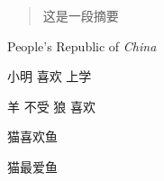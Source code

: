 \documentclass{ctexart}
\newcommand{\PRC}{People's Republic of \emph{China}}
\newcommand{\loves}[2]{#1 喜欢 #2}
\newcommand{\hatedby}[2]{#2 不受 #1 喜欢}
\newcommand{\love}[3][喜欢]{#2#1#3}
\begin{document}
    \begin{abstract}
        这是一段摘要
    \end{abstract}

    \PRC

    \loves{小明}{上学}

    \hatedby{狼}{羊}

    \love{猫}{鱼}

    \love[最爱]{猫}{鱼}
\end{document}

